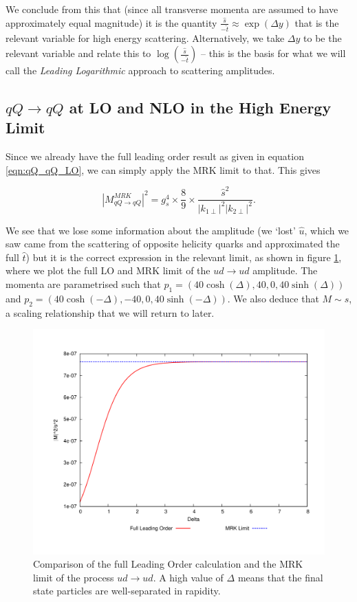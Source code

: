 We conclude from this that (since all transverse momenta are assumed to have approximately equal magnitude) it is the quantity $\frac{\hat{s}}{-\hat{t}} \approx \exp(\Delta y)$ that is the relevant variable for high energy scattering. Alternatively, we take $\Delta y$ to be the relevant variable and relate this to $\log(\frac{\hat{s}}{-\hat{t}})$ -- this is the basis for what we will call the \emph{Leading Logarithmic} approach to scattering amplitudes. 

\subsection{$qQ \to qQ$ at LO and NLO in the High Energy Limit}

Since we already have the full leading order result as given in equation \ref{eqn:qQ_qQ_LO}, we can simply apply the MRK limit to that. This gives

\begin{equation}
|M_{qQ\to qQ}^{MRK}|^2 = g_s^4 \times \frac{8}{9} \times \frac{\hat{s}^2}{|k_{1 \perp}|^2 |k_{2 \perp}|^2}.
\end{equation}

We see that we lose some information about the amplitude (we `lost' $\hat{u}$, which we saw came from the scattering of opposite helicity quarks and approximated the full $\hat{t}$) but it is the correct expression in the relevant limit, as shown in figure \ref{fig:qQ_LO_MRK}, where we plot the full LO and MRK limit of the $ud \to ud$ amplitude. The momenta are parametrised such that $p_1 =  \left(40 \cosh(\Delta), 40, 0, 40 \sinh(\Delta) \right)$ and $p_2 =  \left(40 \cosh(-\Delta), -40, 0, 40 \sinh(-\Delta) \right)$. We also deduce that $M \sim \hat{s}$, a scaling relationship that we will return to later.

\begin{figure}[t]
\centering
\includegraphics[scale=0.5]{Images/ud_ud_plots.pdf} 
\caption{Comparison of the full Leading Order calculation and the MRK limit of the process $ud \to ud$. A high value of $\Delta$ means that the final state particles are well-separated in rapidity.}
\label{fig:qQ_LO_MRK}
\end{figure}

